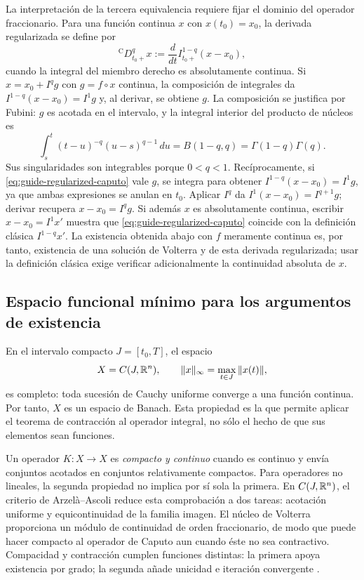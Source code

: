 La interpretación de la tercera equivalencia requiere fijar el dominio
del operador fraccionario. Para una función continua $x$ con $x(t_0)=x_0$,
la derivada regularizada se define por
\begin{equation}
 {}^{\mathrm C}D_{t_0+}^{q}x
 :=\frac{d}{dt}I_{t_0+}^{1-q}(x-x_0),
 \label{eq:guide-regularized-caputo}
\end{equation}
cuando la integral del miembro derecho es absolutamente continua.
Si $x=x_0+I^qg$ con $g=f\circ x$ continua, la composición de integrales
da $I^{1-q}(x-x_0)=I^1g$ y, al derivar, se obtiene $g$.
La composición se justifica por Fubini: $g$ es acotada en el intervalo,
y la integral interior del producto de núcleos es
\[
 \int_s^t(t-u)^{-q}(u-s)^{q-1}\,du
 =B(1-q,q)=\Gamma(1-q)\Gamma(q).
\]
Sus singularidades son integrables porque $0<q<1$. Recíprocamente, si
\cref{eq:guide-regularized-caputo} vale $g$, se integra para obtener
$I^{1-q}(x-x_0)=I^1g$, ya que ambas expresiones se anulan en $t_0$.
Aplicar $I^q$ da $I^1(x-x_0)=I^{q+1}g$; derivar recupera
$x-x_0=I^qg$. Si además $x$ es absolutamente continua, escribir
$x-x_0=I^1x'$ muestra que
\cref{eq:guide-regularized-caputo} coincide con la definición clásica
$I^{1-q}x'$. La existencia obtenida abajo con $f$ meramente continua
es, por tanto, existencia de una solución de Volterra y de esta derivada
regularizada; usar la definición clásica exige verificar adicionalmente
la continuidad absoluta de $x$.

\subsection{Espacio funcional mínimo para los argumentos de existencia}

En el intervalo compacto \(J=[t_0,T]\), el espacio
\begin{equation}
 X=C(J,\mathbb{R}^n),\qquad
 \|x\|_\infty=\max_{t\in J}\|x(t)\|,
 \label{eq:guide-sup-norm}
\end{equation}
es completo: toda sucesión de Cauchy uniforme converge a una función continua.
Por tanto, \(X\) es un espacio de Banach. Esta propiedad es la que permite
aplicar el teorema de contracción al operador integral, no sólo el hecho de que
sus elementos sean funciones.

Un operador \(K:X\to X\) es \emph{compacto y continuo} cuando
es continuo y envía conjuntos acotados en conjuntos relativamente compactos.
Para operadores no lineales, la segunda propiedad no implica por sí sola la
primera. En \(C(J,\mathbb{R}^n)\), el criterio de
Arzelà--Ascoli reduce esta comprobación a dos tareas: acotación uniforme y
equicontinuidad de la familia imagen. El núcleo de Volterra proporciona un
módulo de continuidad de orden fraccionario, de modo que puede hacer compacto
al operador de Caputo aun cuando éste no sea contractivo. Compacidad y
contracción cumplen funciones distintas: la primera apoya existencia por grado;
la segunda añade unicidad e iteración convergente
\cite{Deimling1985,Amster2021MetodosTopologicos}.

